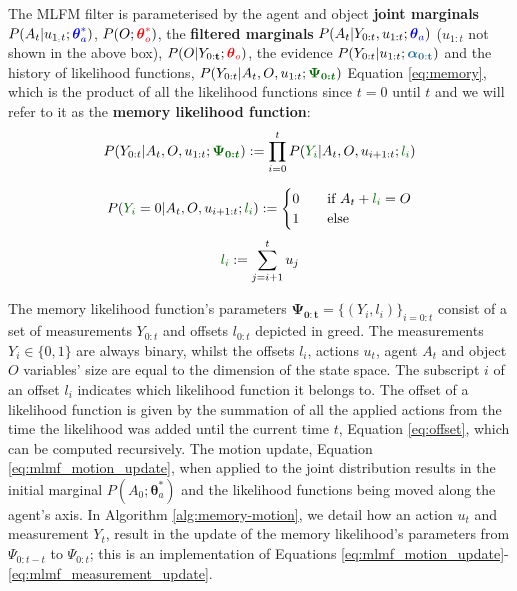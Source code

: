 \documentclass{frontiersSCNS} %
\newcommand*{\mathcolor}{}
\def\mathcolor#1#{\mathcoloraux{#1}}
\newcommand*{\mathcoloraux}[3]{%
  \protect\leavevmode
  \begingroup
    \color#1{#2}#3%
  \endgroup
}
\newcommand{\ThAs}{\boldsymbol{\theta}^*_a}
\newcommand{\ThOs}{\boldsymbol{\theta}^*_o}
\newcommand{\ThA}{\boldsymbol{\theta}_a}
\newcommand{\ThO}{\boldsymbol{\theta}_o}
\newcommand{\BAlph}{\boldsymbol{\alpha}_{\mathbf{0:t}}}
\newcommand{\BPsi}{\boldsymbol{\Psi_{0:t}}}
\begin{document}
The MLFM filter is parameterised by the agent and object 
\textbf{joint marginals} $P(A_t|u_{1_:t};\mathcolor{blue}{\ThAs})$, $P(O;\mathcolor{red}{\ThOs})$, the \textbf{filtered marginals}  
$P(A_t|Y_{0:t},u_{1:t};\mathcolor{blue}{\ThA})$ ($u_{1:t}$ not shown in the above box), $P(O|Y_{0:\mathbf{t}};\mathcolor{red}{\ThO})$, 
the evidence $P(Y_{0:t}|u_{1:t};\mathcolor{dark-blue}{\BAlph})$ and the history of likelihood functions, $P(Y_{0:t}|A_t,O,u_{1:t};\mathcolor{dark-green}{\BPsi})$ Equation \ref{eq:memory}, which is 
the product of all the likelihood functions since $t=0$ until $t$ and we will refer to it as the \textbf{memory likelihood function}: 
\begin{equation}
 P(Y_{0:t}|A_t,O,u_{1:t};\mathcolor{dark-green}{\BPsi}) := \prod_{i=0}^t P(\mathcolor{dark-green}{Y_i}|A_t,O,u_{i+1:t};\mathcolor{dark-green}{l_i}) \label{eq:memory}
\end{equation}

\begin{equation} \label{eq:ch5:liklihood_v2}
P(\mathcolor{dark-green}{Y_i}=0|A_t,O,u_{i+1:t};\mathcolor{dark-green}{l_i}) :=
  \begin{cases}
    0       & \quad \text{if } A_t + \mathcolor{dark-green}{l_i} = O     \\
    1  	    & \quad \text{else}  \\
  \end{cases}
\end{equation}
\begin{equation}
  \mathcolor{dark-green}{l_i} := \sum\limits_{j=i+1}^t u_j  \label{eq:offset}
\end{equation}

The memory likelihood function's parameters $\BPsi = \{(Y_i,l_i)\}_{i=0:t}$ consist of a set of measurements $Y_{0:t}$ and offsets $l_{0:t}$
depicted in greed. The measurements $Y_i \in \{0,1\}$ are always binary, whilst the offsets $l_i$, actions $u_t$, 
agent $A_t$ and object $O$ variables' size are equal to the dimension of the state space. The subscript $i$ 
of an offset $l_i$ indicates which likelihood function it belongs to. The offset of a likelihood function is given by the 
summation of all the applied actions from the time the likelihood was added until the current time $t$, Equation \ref{eq:offset}, which can be computed recursively.
The motion update, Equation \ref{eq:mlmf_motion_update}, when applied to the joint distribution results in the 
initial marginal $P(A_0;\ThAs)$ and the likelihood functions being moved along the agent's axis. In Algorithm \ref{alg:memory-motion}, we detail how an action $u_t$ and measurement $Y_t$, result in the update of
the memory likelihood's parameters from $\Psi_{0:t-t}$ to $\Psi_{0:t}$; this is an implementation of 
Equations \ref{eq:mlmf_motion_update}-\ref{eq:mlmf_measurement_update}.
\end{document}
